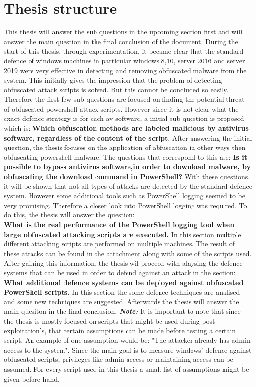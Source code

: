 \documentclass{article}%
\begin{document}
\section{Thesis structure}
This thesis will answer the sub questions in the upcoming section first and will answer the main question in the final conclusion of the document. During the start of this thesis, through experimentation, it became clear that the standard defence of windows machines in particular windows 8,10, server 2016 and server 2019 were very effective in detecting and removing obfuscated malware from the system. This initially gives the impression that the problem of detecting obfuscated attack scripts is solved. But this cannot be concluded so easily. Therefore the first few sub-questions are focused on finding the potential threat of obfuscated powershell attack scripts. However since it is not clear what the exact defence strategy is for each av software, a initial sub question is proposed which is:\newline
\hfill 
\textbf{Which obfuscation methods are labeled malicious by antivirus software, regardless of the content of the script}.
After answering the initial question, the thesis focuses on the application of abfuscation in other ways then obfuscating powershell malware. The questions that correspond to this are:\newline
\textbf{Is it possible to bypass antivirus software,in order to download malware, by obfuscating the download command in PowerShell?}\newline
With these questions, it will be shown that not all types of attacks are detected by the standard defence system. However some additional tools such as PowerShell logging seemed to be very promising. Therefore a closer look into PowerShell logging was required. To do this, the thesis will answer the question: \\
\textbf{What is the real performance of the PowerShell logging tool when large obfuscated attacking scripts are executed.}
In this section multiple different attacking scripts are performed on multiple machines. The result of these attacks can be found in the attachment along with some of the scripts used. After gaining this information, the thesis wil proceed with alaysing the defence systems that can be used in order to defend against an attack in the section:
\textbf{What additional defence systems can be deployed against obfuscated PowerShell scripts.} In this section the some defence techniques are analised and some new techniques are suggested. Afterwards the thesis will answer the main quesiton in the final conclusion.
\newline
\newline
\textbf{\textit{Note:}} It is important to note that since the thesis is mostly focused on scripts that might be used during post-exploitation's, that certain assumptions can be made before testing a certain script. An example of one assumption would be: "The attacker already has admin access to the system". Since the main goal is to measure windows' defence against obfuscated scripts, privileges like admin access or maintaining access can be assumed. For every script used in this thesis a small list of assumptions might be given before hand.
\end{document}
